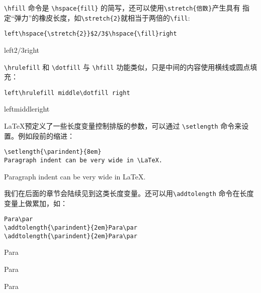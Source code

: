 \verb|\hfill| 命令是 \verb|\hspace{fill}| 的简写，还可以使用\verb|\stretch{倍数}|产生具有
指定“弹力”的橡皮长度，如\verb|\stretch{2}|就相当于两倍的\verb|\fill|:

\begin{minipage}[t]{0.45\textwidth}
\begin{lstlisting}
left\hspace{\stretch{2}}$2/3$\hspace{\fill}right
\end{lstlisting}
\end{minipage}
\hfill
\begin{minipage}[t]{0.45\textwidth}
    left$2/3$\hspace{\fill}right
\end{minipage}

\verb|\hrulefill| 和 \verb|\dotfill| 与 \verb|\hfill| 功能类似，只是中间的内容使用横线或圆点填充：

\begin{minipage}[t]{0.45\textwidth}
\begin{lstlisting}
left\hrulefill middle\dotfill right
\end{lstlisting}
\end{minipage}
\hfill
\begin{minipage}[t]{0.45\textwidth}
    left\hrulefill middle\dotfill right
\end{minipage}

\LaTeX 预定义了一些长度变量控制排版的参数，可以通过 \verb|\setlength| 命令来设置。例如段前的缩进：

\begin{minipage}[t]{0.45\textwidth}
\begin{lstlisting}
\setlength{\parindent}{8em}
Paragraph indent can be very wide in \LaTeX.
\end{lstlisting}
\end{minipage}
\hfill
\begin{minipage}[t]{0.45\textwidth}
    \setlength{\parindent}{8em}
    Paragraph indent can be very wide in \LaTeX.
\end{minipage}

我们在后面的章节会陆续见到这类长度变量。还可以用\verb|\addtolength| 命令在长度变量上做累加，如：

\begin{minipage}[t]{0.45\textwidth}
\begin{lstlisting}
Para\par
\addtolength{\parindent}{2em}Para\par
\addtolength{\parindent}{2em}Para\par
\end{lstlisting}
\end{minipage}
\hfill
\begin{minipage}[t]{0.45\textwidth}
    Para\par
    \addtolength{\parindent}{2em}Para\par
    \addtolength{\parindent}{2em}Para\par
\end{minipage}


